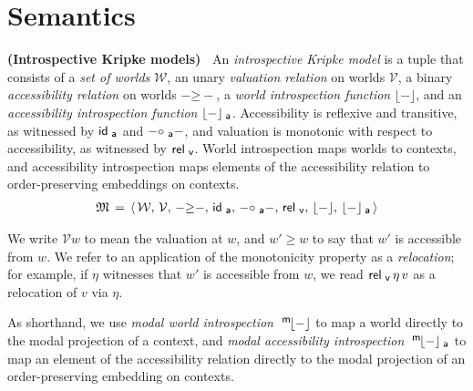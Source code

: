 \documentclass{entcs}
\numberwithin{equation}{thm}
\newcommand{\binop}[1]{-\mathord{#1}-}
\newcommand{\tsf}[1]{\textsf{\upshape{#1}}}
\newcommand{\stsf}[1]{\tsf{\small{#1}}}
\renewcommand{\:}{\mathrel{:}}
\newcommand{\0}{\varnothing}
\newcommand{\M}{\mathfrak{M}}
\newcommand{\W}{\mathcal{W}}
\newcommand{\V}{\mathrel{\mathcal{V}}}
\newcommand{\ida}{\operatorname{\tsf{id}_{\stsf{a}}}}
\newcommand{\compa}{\mathrel{\circ_{\stsf{a}}}}
\newcommand{\relv}{\operatorname{\tsf{rel}_{\stsf{v}}}}
\newcommand{\peek}[1]{\mathopen{\lfloor}{#1}\mathclose{\rfloor}}
\newcommand{\peeka}[1]{\mathopen{\lfloor}{#1}\mathclose{\rfloor_{\mkern-2mu\stsf{a}}}}
\newcommand{\mpeek}[1]{\mathopen{^{\stsf{m}\mkern-3mu}\lfloor}{#1}\mathclose{\rfloor}}
\newcommand{\mpeeka}[1]{\mathopen{^{\stsf{m}\mkern-3mu}\lfloor}{#1}\mathclose{\rfloor_{\mkern-2mu\stsf{a}}}}
\begin{document}
\lipsum[1-5]


\section{Semantics}

\begin{definition}
  \textbf{(Introspective Kripke models)\ }
  An \emph{introspective Kripke model} is a tuple that consists of a \emph{set of worlds} $\W$, an unary \emph{valuation relation} on worlds $\V$, a binary \emph{accessibility relation} on worlds $\binop{\ge}$, a \emph{world introspection function} $\peek{-}$, and an \emph{accessibility introspection function} $\peeka{-}$.
  Accessibility is reflexive and transitive, as witnessed by $\ida$ and $\binop{\compa}$, and valuation is monotonic with respect to accessibility, as witnessed by $\relv$.
  World introspection maps worlds to contexts, and accessibility introspection maps elements of the accessibility relation to order-preserving embeddings on contexts.
  \begin{gather*}
    \M \,=\, \langle\, \W,\, \V,\, \binop{\ge},\, \ida,\, \binop{\compa},\, \relv,\, \peek{-},\, \peeka{-}\, \rangle
  \end{gather*}
\end{definition}

\noindent
We write $\V w$ to mean the valuation at $w$, and $w' \ge w$ to say that $w'$ is accessible from $w$.
We refer to an application of the monotonicity property as a \emph{relocation}; for example, if $\eta$ witnesses that $w'$ is accessible from $w$, we read $\relv \eta\, v$ as a relocation of $v$ via $\eta$.

As shorthand, we use \emph{modal world introspection} $\mpeek{-}$ to map a world directly to the modal projection of a context, and \emph{modal accessibility introspection} $\mpeeka{-}$ to map an element of the accessibility relation directly to the modal projection of an order-preserving embedding on contexts.
\end{document}

